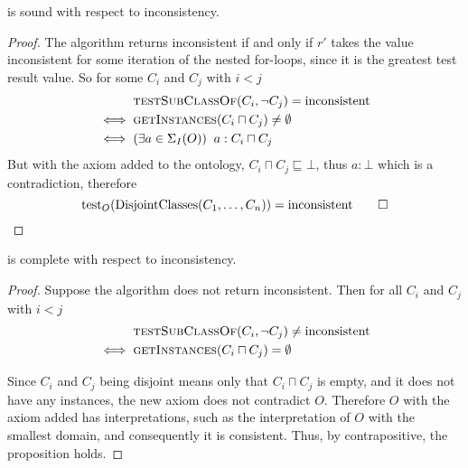 \documentclass[paper.tex]{subfiles}
\begin{document}
\begin{proposition}
  \label{prop:testDisjointClassesInconsistentSound}
   is sound with respect to inconsistency.
\end{proposition}
\begin{proof}
  The algorithm returns inconsistent if and only if $r'$ takes the value inconsistent for some iteration of the nested for-loops, since it is the greatest test result value.  So for some $C_i$ and $C_j$ with $i < j$
  \begin{align*}
    & \Call{testSubClassOf}{C_i, \neg C_j} = \inconsistent \\
    \iff{}& \Call{getInstances}{C_i \sqcap C_j} \ne \emptyset \\
    \iff{}& (\exists a \in \signatureI(O)) \;\; a : C_i \sqcap C_j
  \end{align*}
  But with the axiom added to the ontology, $C_i \sqcap C_j \sqsubseteq \bot$, thus $a : \bot$ which is a contradiction, therefore
  \[ \operatorname{test}_O(\mathrm{DisjointClasses}(C_1, \ldots, C_n)) = \mathrm{inconsistent} \qed \]
\end{proof}

\begin{proposition}
  \label{prop:testDisjointClassesInconsistentComplete}
  \sloppy
   is complete with respect to inconsistency.
\end{proposition}
\begin{proof}
  Suppose the algorithm does not return inconsistent.  Then for all $C_i$ and $C_j$ with $i < j$
  \begin{align*}
    & \Call{testSubClassOf}{C_i, \neg C_j} \ne \inconsistent \\
    \iff{}& \Call{getInstances}{C_i \sqcap C_j} = \emptyset
  \end{align*}

  Since $C_i$ and $C_j$ being disjoint means only that $C_i \sqcap C_j$ is empty, and it does not have any instances, the new axiom does not contradict $O$.  Therefore $O$ with the axiom added has interpretations, such as the interpretation of $O$ with the smallest domain, and consequently it is consistent.  Thus, by contrapositive, the proposition holds.
\end{proof}
\end{document}
